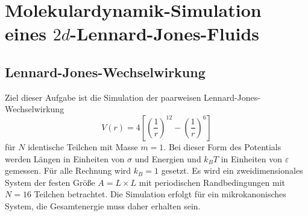 



\maketitle

\section*{Molekulardynamik-Simulation eines $2d$-Lennard-Jones-Fluids}
\subsection*{Lennard-Jones-Wechselwirkung}
\label{section: Einleitung}
Ziel dieser Aufgabe ist die Simulation der paarweisen Lennard-Jones-Wechselwirkung
\begin{equation*}
    V \left(r\right) = 4 \left[\left(\frac{1}{r}\right)^{12} - \left(\frac{1}{r}\right)^{6}\right]
\end{equation*}
für $N$ identische Teilchen mit Masse $m = 1$. Bei dieser Form des Potentials werden Längen in Einheiten von $\sigma$
und Energien und $k_B T$ in Einheiten von $\varepsilon$ gemessen.
Für alle Rechnung wird $k_{B}=1$ gesetzt.
Es wird ein zweidimensionales System der festen Größe $A = L \times L$ mit
periodischen Randbedingungen mit  $N = 16$ Teilchen betrachtet. Die Simulation erfolgt für ein mikrokanonisches System,
die Gesamtenergie muss daher erhalten sein.


